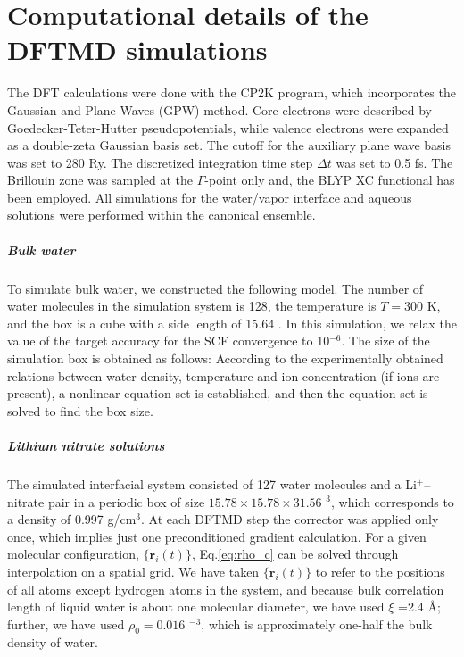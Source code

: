 \chapter{Computational details of the DFTMD simulations}\label{computational_detail}
The DFT calculations were done with the CP2K program\cite{CP2K,Kuehne2020}, which incorporates the Gaussian and Plane Waves (GPW) method\cite{Lippert1999}. 
Core electrons were described by Goedecker-Teter-Hutter pseudopotentials\cite{Goedecker1996,MK05}, while valence electrons were expanded as a double-zeta Gaussian basis set\cite{VandeVondele2007}. 
The cutoff for the auxiliary plane wave basis was set to 280 Ry.
The discretized integration time step $\Delta t$ was set to 0.5 fs. 
The Brillouin zone was sampled at the $\Gamma$-point only and, the BLYP XC functional has been employed.
All simulations for the water/vapor interface and aqueous solutions were performed within the canonical ensemble. 
%
\paragraph{Bulk water}\label{DETAILS_NEAT_WATER}
To simulate bulk water, we constructed the following model. 
The number of water molecules in the simulation system is 128, 
the temperature is $T=300$ K, and the box is a cube with a side length of 15.64 \A. 
In this simulation, we relax the value of the target accuracy for the SCF convergence to 10$^{-6}$. 
The size of the simulation box is obtained as follows: 
According to the experimentally obtained relations between water density, temperature and ion concentration (if ions are present), 
a nonlinear equation set is established, and then the equation set is solved to find the box size.

\paragraph{Lithium nitrate solutions}\label{DETAILS_LINO3}
The simulated interfacial system consisted of 127 water molecules and a Li$^+$--nitrate pair in a periodic
box of size $15.78 \times 15.78 \times 31.56$ \A$^3$, which corresponds to
a density of 0.997 g/cm$^3$. 
At each DFTMD step the corrector was applied only once, which implies just one preconditioned gradient calculation. 
For a given molecular configuration, $\{\mathbf{r}_i (t)\}$, Eq.\thinspace\ref{eq:rho_c} can be
solved through interpolation on a spatial grid\cite{Willard2010}. 
We have taken $\{\mathbf{r}_i (t)\}$ to refer to the positions of all
atoms except hydrogen atoms in the system, and because bulk correlation length of
liquid water is about one molecular diameter, we have used $\xi$ 
=2.4 \AA; further, we have used $\rho_0= 0.016$ \A$^{-3}$, which is
approximately one-half the bulk density of water. 

